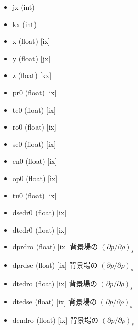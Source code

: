 \documentclass[letterpaper,10pt,dvipdfmx,report]{sphinxmanual}
\begin{document}
\begin{fulllineitems}
\begin{itemize}
\item {} 
jx (int) \sphinxhyphen{}\sphinxhyphen{}

\item {} 
kx (int) \sphinxhyphen{}\sphinxhyphen{}

\item {} 
x (float) {[}ix{]} \sphinxhyphen{}\sphinxhyphen{}

\item {} 
y (float) {[}jx{]} \sphinxhyphen{}\sphinxhyphen{}

\item {} 
z (float) {[}kx{]} \sphinxhyphen{}\sphinxhyphen{}

\item {} 
pr0 (float) {[}ix{]} \sphinxhyphen{}\sphinxhyphen{}

\item {} 
te0 (float) {[}ix{]} \sphinxhyphen{}\sphinxhyphen{}

\item {} 
ro0 (float) {[}ix{]} \sphinxhyphen{}\sphinxhyphen{}

\item {} 
se0 (float) {[}ix{]} \sphinxhyphen{}\sphinxhyphen{}

\item {} 
en0 (float) {[}ix{]}

\item {} 
op0 (float) {[}ix{]}

\item {} 
tu0 (float) {[}ix{]}

\item {} 
dsedr0 (float) {[}ix{]}

\item {} 
dtedr0 (float) {[}ix{]}

\item {} 
dprdro (float) {[}ix{]} \sphinxhyphen{}\sphinxhyphen{} 背景場の \((\partial p/\partial \rho)_s\)

\item {} 
dprdse (float) {[}ix{]} \sphinxhyphen{}\sphinxhyphen{} 背景場の \((\partial p/\partial \rho)_s\)

\item {} 
dtedro (float) {[}ix{]} \sphinxhyphen{}\sphinxhyphen{} 背景場の \((\partial p/\partial \rho)_s\)

\item {} 
dtedse (float) {[}ix{]} \sphinxhyphen{}\sphinxhyphen{} 背景場の \((\partial p/\partial \rho)_s\)

\item {} 
dendro (float) {[}ix{]} \sphinxhyphen{}\sphinxhyphen{} 背景場の \((\partial p/\partial \rho)_s\)


\end{itemize}
\end{fulllineitems}
\end{document}
